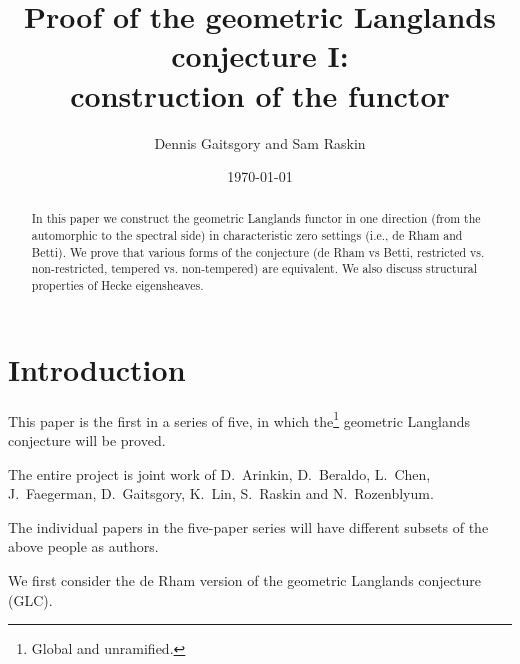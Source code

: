 \documentclass[9pt]{amsart}
\theoremstyle{remark}
\theoremstyle{definition}
\theoremstyle{remark}
\numberwithin{equation}{section}
\begin{document}



\vskip1cm

\title[Proof of the the geometric Langlands conjecture I]{Proof of the geometric Langlands conjecture I: \\ construction of the functor}

\author{Dennis Gaitsgory and Sam Raskin}

\begin{abstract}
In this paper we construct the geometric Langlands functor in one direction (from the automorphic to the spectral side) in characteristic zero
settings (i.e., de Rham and Betti). 
We prove that various forms of the conjecture (de Rham vs Betti, restricted vs. non-restricted, tempered vs. non-tempered)
are equivalent. We also discuss structural properties of Hecke eigensheaves.
\end{abstract}


\date{\today}



\maketitle

\bigskip

\bigskip

\tableofcontents

\section*{Introduction}

This paper is the first in a series of five, in which the\footnote{Global and unramified.}
geometric Langlands conjecture will be proved. 

\medskip

The entire project is joint work of D.~Arinkin, D.~Beraldo, L.~Chen, J.~Faegerman, D.~Gaitsgory, K.~Lin, S.~Raskin and
N.~Rozenblyum. 

\medskip

The individual papers in the five-paper series will have different subsets of the above people as authors. 


We first consider the de Rham version of the geometric Langlands conjecture (GLC). 
\end{document}
